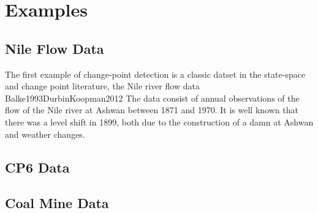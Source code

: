 \documentclass{article}
\begin{document}
\section{Examples}
\label{sec:examples}

\subsection{Nile Flow Data}
\label{sec:nile}

The first example of change-point detection is a classic datset in the state-space and change point literature, the Nile river flow data \textcite{Cobb1978}{Balke1993}{DurbinKoopman2012}
The data consist of annual observations of the flow of the Nile river at Ashwan between 1871 and 1970. 
It is well known that there was a level shift in 1899, both due to the construction of a damn at Ashwan and weather changes.

\subsection{CP6 Data}
\label{sec:cp6-data}



\subsection{Coal Mine Data}
\label{sec:coal-mine-data}



\printbibliography{}
\end{document}
